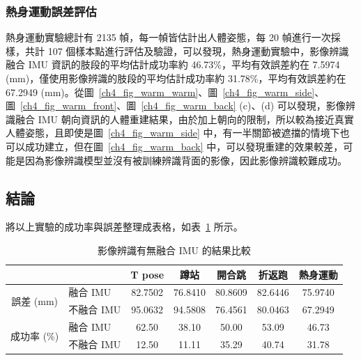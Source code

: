 \subsubsection*{熱身運動誤差評估}
熱身運動實驗總計有 2135 幀，每一幀皆估計出人體姿態，每 20 幀進行一次採樣，共計 107 個樣本點進行評估及驗證，可以發現，熱身運動實驗中，影像辨識融合 IMU 資訊的肢段的平均估計成功率約 46.73\%，平均有效誤差約在 7.5974 (mm)，僅使用影像辨識的肢段的平均估計成功率約 31.78\%，平均有效誤差約在 67.2949 (mm)。從圖~\ref{ch4_fig_warm_warm}、圖~\ref{ch4_fig_warm_side}、圖~\ref{ch4_fig_warm_front}、圖~\ref{ch4_fig_warm_back} (c)、(d) 可以發現，影像辨識融合 IMU 朝向資訊的人體重建結果，由於加上朝向的限制，所以較為接近真實人體姿態，且即使是圖~\ref{ch4_fig_warm_side} 中，有一半關節被遮擋的情境下也可以成功建立，但在圖~\ref{ch4_fig_warm_back} 中，可以發現重建的效果較差，可能是因為影像辨識模型並沒有被訓練辨識背面的影像，因此影像辨識較難成功。

\subsection{結論}
將以上實驗的成功率與誤差整理成表格，如表~\ref{ch4_tab_conclusion} 所示。
\begin{table}[ht]
   \centering
   \begin{tabular}{clccccc}
   \toprule
    & & T pose & 蹲站 & 開合跳 & 折返跑 & 熱身運動 \\
   \midrule
   \multirow{2}{*}{誤差 (mm)} & 融合 IMU & 82.7502 & 76.8410 & 80.8609 & 82.6446 & 75.9740 \\
   & 不融合 IMU & 95.0632 & 94.5808 & 76.4561 & 80.0463 & 67.2949 \\
   \midrule
   \multirow{2}{*}{成功率 (\%)} & 融合 IMU & 62.50 & 38.10 & 50.00 & 53.09 & 46.73 \\
   & 不融合 IMU & 12.50 & 11.11 & 35.29 & 40.74 & 31.78 \\
   \bottomrule
   \end{tabular}
   \caption{影像辨識有無融合 IMU 的結果比較}
   \label{ch4_tab_conclusion}
\end{table}

